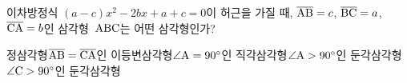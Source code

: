이차방정식 $(a-c)x^2-2bx+a+c=0$이 허근을 가질 때, $\overline{\mathrm{AB}}=c$, $\overline{\mathrm{BC}}=a$, $\overline{\mathrm{CA}}=b$인 삼각형~$\mathrm{ABC}$는 어떤 삼각형인가? 
\begin{choicesv}{정삼각형}{$\overline{\mathrm{AB}}=\overline{\mathrm{CA}}$인 이등변삼각형}{$\angle\mathrm{A}=90^\circ$인 직각삼각형}{$\angle\mathrm{A}>90^\circ$인 둔각삼각형}{$\angle\mathrm{C}>90^\circ$인 둔각삼각형}\end{choicesv}

